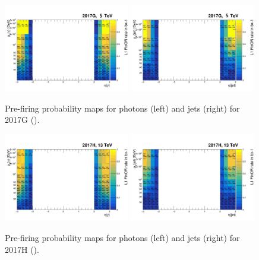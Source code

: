 \begin{figure}[htb]
\centering
\includegraphics[width=0.49\textwidth]{plots/Prefire/L1prefiring_photonpt_2017G.pdf}
\includegraphics[width=0.49\textwidth]{plots/Prefire/L1prefiring_jetpt_2017G.pdf}
\caption{Pre-firing probability maps for photons (left) and jets (right) for 2017G (\sg).}
\label{fig:prefire:2017G}
\end{figure}

\begin{figure}[htb]
\centering
\includegraphics[width=0.49\textwidth]{plots/Prefire/L1prefiring_photonpt_2017H.pdf}
\includegraphics[width=0.49\textwidth]{plots/Prefire/L1prefiring_jetpt_2017H.pdf}
\caption{Pre-firing probability maps for photons (left) and jets (right) for 2017H (\sh). }
\label{fig:prefire:2017H}
\end{figure}